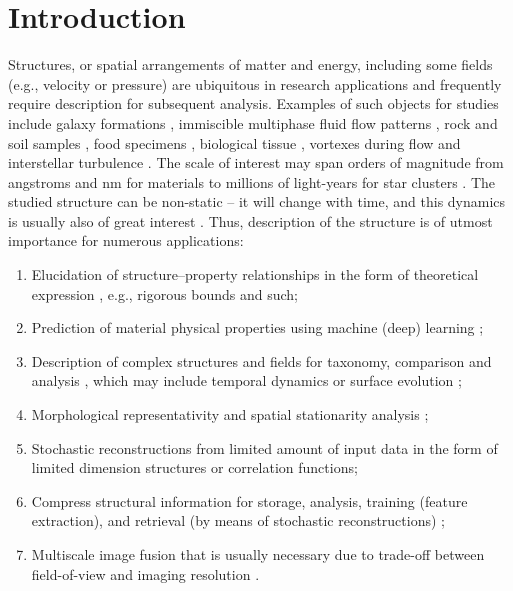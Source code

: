\documentclass[reprint,amsmath,amssymb,aps,pre,showkeys,showpacs]{revtex4-1}
\begin{document}
\section{Introduction}
Structures, or spatial arrangements of matter and energy, including some fields
(e.g., velocity or pressure) are ubiquitous in research applications and
frequently require description for subsequent analysis. Examples of such objects
for studies include galaxy formations \cite{springel2006}, immiscible multiphase
fluid flow patterns \cite{hopkins2015new,balashov2021}, rock and soil samples
\cite{rozenbaum2014,karsanina2015,ledesma2018,chen2020super,prokhorov2021digital,vogel2010},
food specimens \cite{derossi2019,nagdalian2021}, biological tissue
\cite{park2020}, vortexes during flow \cite{gorbunova2016precessing} and
interstellar turbulence \cite{portillo2018developing}. The scale of interest may
span orders of magnitude from angstroms and nm for materials
\cite{garum2020,gerke2021,khlyupin2023molecular} to millions of light-years for
star clusters \cite{takada2003three,hopkins2013stars}. The studied structure can
be non-static -- it will change with time, and this dynamics is usually also of
great interest \cite{jiao2013,fomin2023soil}. Thus, description of the structure
is of utmost importance for numerous applications:
\begin{enumerate}
  \item Elucidation of structure--property relationships in the form of
    theoretical expression \cite{Torquato_book,Sahimi_book}, e.g., rigorous
    bounds and such;
  \item Prediction of material physical properties using machine (deep) learning
    \cite{obayashi2018persistence,kamrava2020linking,roding2020predicting};
  \item Description of complex structures and fields for taxonomy, comparison
    and analysis
    \cite{takada2003three,hopkins2013stars,shivashankar2015felix,saadatfar2017pore,
      portillo2018developing,KarsaninaEJSS,PNM_Morse,khlyupin2023molecular},
    which may include temporal dynamics or surface evolution
    \cite{jiao2013,PhysRevE.92.023301,prokhorov2022,chen2022,fomin2023soil};
  \item Morphological representativity
    \cite{capek2009,rozenbaum2014,gerke2019tensor} and spatial stationarity
    analysis \cite{REVpaper,LavrukhinPRE};
  \item Stochastic reconstructions from limited amount of input data
    \cite{Adler_recon,Y-T,tahmasebiPRL,Euras2012,EPL2,karsaninaPRL,rozanski2023}
    in the form of limited dimension structures or correlation functions;
  \item Compress structural information for storage, analysis, training (feature
    extraction), and retrieval (by means of stochastic reconstructions)
    \cite{jiao2007,SciRep1,Havelka,KarsaninaEJSS};
  \item Multiscale image fusion that is usually necessary due to trade-off
    between field-of-view and imaging resolution
    \cite{SciRep1,Geoderma2018,chen2020super,karimpouli2022}.
\end{enumerate}
\end{document}
